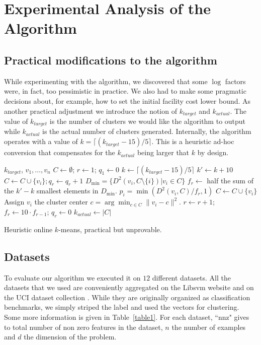 \documentclass{article}
\def\tab{\hspace{5mm}}
\begin{document}
\section{Experimental Analysis of the Algorithm}
\subsection{Practical modifications to the algorithm}
While experimenting with the algorithm, we discovered that some $\log$ factors were, in fact, too pessimistic in practice.
We also had to make some pragmatic decisions about, for example, how to set the initial facility cost lower bound.
As another practical adjustment we introduce the notion of $k_{target}$ and $k_{actual}$.
The value of $k_{target}$ is the number of clusters we would like the algorithm to output while $k_{actual}$ is the actual number of clusters generated.
Internally, the algorithm operates with a value of $k = \lceil(k_{target}-15)/5\rceil$. 
This is a heuristic ad-hoc conversion that compensates for the $k_{actual}$ being larger that $k$ by design.

\begin{algorithm}
\begin{algorithmic}
 $k_{target}$,  $v_1,\ldots,v_n$
\STATE $C \gets \emptyset$;\;\; $r \gets 1$;\;\; $q_1 \gets 0$
\STATE $k \gets \lceil(k_{target}-15)/5\rceil$
\STATE $k' \gets k+10$
	\STATE \tab $C \gets C \cup \{v_i\}; q_r\gets q_r+1$
\ENDFOR
\STATE $D_{\min} = \{D^2(v_i,C \setminus \{i\}) | v_i \in C\}$
\STATE $f_r\gets$ half the sum of the $k'-k$ smallest elements in $D_{\min}$.
	 $p_i = \min(D^2(v_i, C)/f_r,1)$
	\STATE \tab $C \gets C \cup \{v_i\}$
	\STATE Assign $v_i$ the cluster center $c = \arg\min_{c \in C}\|v_i - c\|^2$.
		\STATE $r \gets r+1$;\;\;  $f_r \gets 10\cdot f_{r-1}$;\;\; $q_r \gets 0$
	\ENDIF
\ENDFOR
\STATE $k_{actual} \gets |C|$
\caption{Heuristic online $k$-means, practical but unprovable.}\label{alg2}
\end{algorithmic}
\end{algorithm}

\subsection{Datasets}
To evaluate our algorithm we executed it on $12$ different datasets.
All the datasets that we used are conveniently aggregated on the Libsvm website \cite{libsvmData} and on the UCI dataset collection \cite{UCIdata}.
While they are originally organized as classification benchmarks, we simply striped the label and used the vectors for clustering.
Some more information is given in Table~\ref{table1}. 
For each dataset, ``nnz" gives to total number of non zero features in the dataset, $n$ the number of examples and $d$ the dimension of the problem.
\end{document}
